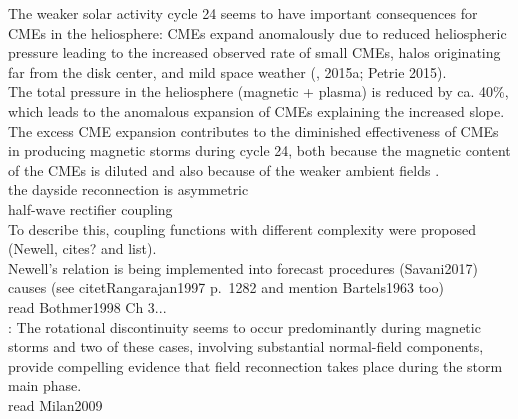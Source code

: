 The weaker solar activity cycle 24 seems to have important consequences for CMEs in the heliosphere: CMEs expand anomalously due to reduced heliospheric pressure leading to the increased observed rate of small CMEs, halos originating far from the disk center, and mild space weather (\citep{Gopalswamy2014}, 2015a; Petrie 2015).\\
The total pressure in the heliosphere (magnetic + plasma) is reduced by ca. 40\%, which leads to the anomalous expansion of CMEs explaining the increased slope. The excess CME expansion contributes to the diminished effectiveness of CMEs in producing magnetic storms during cycle 24, both because the magnetic content of the CMEs is diluted and also because of the weaker ambient fields \citep{Gopalswamy2014}.\\

the dayside reconnection is asymmetric\\
half-wave rectifier coupling\\
To describe this, coupling functions with different complexity were proposed (Newell, cites? and list).\\
Newell's relation is being implemented into forecast procedures (Savani2017)\\

causes (see citet{Rangarajan1997} p.~1282 and mention Bartels1963 too)\\
read Bothmer1998 Ch 3...\\


\citet{Sonnerup1967}: The rotational discontinuity seems to occur predominantly during magnetic storms and two of these cases, involving substantial normal-field components, provide compelling evidence that field reconnection takes place during the storm main phase.\\

read Milan2009\\	%



